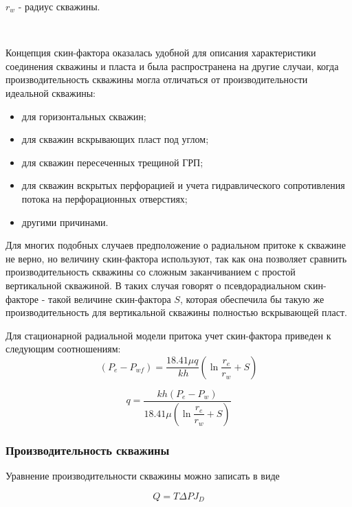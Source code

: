 $r_w$ - радиус скважины.

\

Концепция скин-фактора оказалась удобной для описания характеристики соединения скважины и пласта и была распространена на другие случаи, когда производительность скважины могла отличаться от производительности идеальной скважины:
\begin{itemize}
	\item для горизонтальных скважин;
	\item для скважин вскрывающих пласт под углом;
	\item для скважин пересеченных трещиной ГРП;
	\item для скважин вскрытых перфорацией и учета гидравлического сопротивления потока на перфорационных отверстиях;
	\item другими причинами.
\end{itemize}

Для многих подобных случаев предположение о радиальном притоке к скважине не верно, но величину скин-фактора используют, так как она позволяет сравнить производительность скважины со сложным заканчиванием с простой вертикальной скважиной. В таких случая говорят о псевдорадиальном скин-факторе - такой величине скин-фактора $S$, которая обеспечила бы такую же производительность для вертикальной скважины полностью вскрывающей пласт. 

Для стационарной радиальной модели притока учет скин-фактора приведен к следующим соотношениям:
\begin{equation} \label{eq:dupui_skin_1}
(P_e - P_{wf}) = \frac{18.41\mu q }{\ k h}(\ln\frac{r_e}{r_w}+S) 
\end{equation}


\begin{equation} \label{eq:dupui_skin_2}
q=\frac{kh\left(P_e-P_w\right)}{ 18.41 \mu\left(\ln{\dfrac{r_e}{r_w}} + S\right)}
\end{equation}

\subsubsection{Производительность скважины}

Уравнение производительности скважины можно записать в виде

\begin{equation} \label{eq:well_productivity}
Q = T \Delta P J_D
\end{equation}

